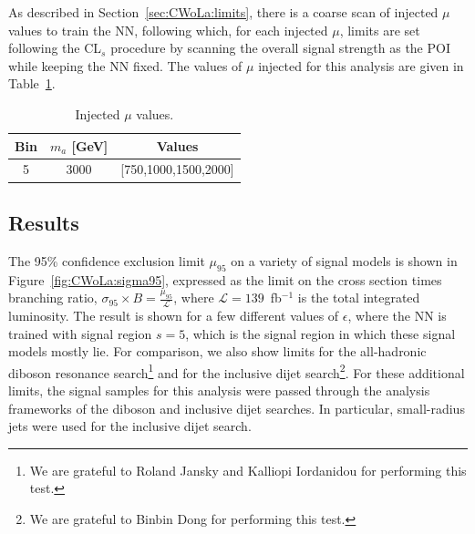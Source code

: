 As described in Section~\ref{sec:CWoLa:limits}, there is a coarse scan of injected $\mu$ values to train the NN, following which, for each injected $\mu$, limits are set following the CL$_s$ procedure by scanning the overall signal strength as the POI while keeping the NN fixed.
The values of $\mu$ injected for this analysis are given in Table~\ref{tab:MC:injectedmu}.

\begin{table}[htb]
  \centering
  \caption{Injected $\mu$ values.}
  \label{tab:MC:injectedmu}
  \begin{tabular}{c c c}
    \hline
    Bin & $m_a$ [GeV] & Values \\ \hline
    5 & 3000 & [750,1000,1500,2000] \\
    \hline
  \end{tabular}
\end{table} 


\subsection{Results}


The 95\% confidence exclusion limit $\mu_{95}$ on a variety of signal models is shown in Figure~\ref{fig:CWoLa:sigma95}, expressed as the limit on the cross section times branching ratio, $\sigma_{95}\times B = \frac{\mu_{95}}{\mathcal{L}}$, where $\mathcal{L} = 139$~fb$^{-1}$ is the total integrated luminosity.
The result is shown for a few different values of $\epsilon$, where the NN is trained with signal region $s=5$, which is the signal region in which these signal models mostly lie.
For comparison, we also show limits for the all-hadronic diboson resonance search\footnote{We are grateful to Roland Jansky and Kalliopi Iordanidou for performing this test.} and for the inclusive dijet search\footnote{We are grateful to Binbin Dong for performing this test.}.
For these additional limits, the signal samples for this analysis were passed through the analysis frameworks of the diboson and inclusive dijet searches.
In particular, small-radius jets were used for the inclusive dijet search.

